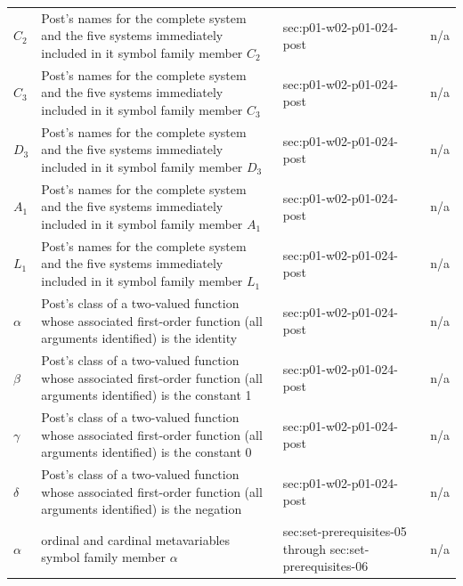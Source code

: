 \begin{longtable}{@{}p{}p{}p{}p{}@{}}
\(C_2\) & Post's names for the complete system and the five systems immediately included in it symbol family member \(C_2\) & sec:\allowbreak{}p01-\allowbreak{}w02-\allowbreak{}p01-\allowbreak{}024-\allowbreak{}post & n/a \\
\(C_3\) & Post's names for the complete system and the five systems immediately included in it symbol family member \(C_3\) & sec:\allowbreak{}p01-\allowbreak{}w02-\allowbreak{}p01-\allowbreak{}024-\allowbreak{}post & n/a \\
\(D_3\) & Post's names for the complete system and the five systems immediately included in it symbol family member \(D_3\) & sec:\allowbreak{}p01-\allowbreak{}w02-\allowbreak{}p01-\allowbreak{}024-\allowbreak{}post & n/a \\
\(A_1\) & Post's names for the complete system and the five systems immediately included in it symbol family member \(A_1\) & sec:\allowbreak{}p01-\allowbreak{}w02-\allowbreak{}p01-\allowbreak{}024-\allowbreak{}post & n/a \\
\(L_1\) & Post's names for the complete system and the five systems immediately included in it symbol family member \(L_1\) & sec:\allowbreak{}p01-\allowbreak{}w02-\allowbreak{}p01-\allowbreak{}024-\allowbreak{}post & n/a \\
\(\alpha\) & Post's class of a two-valued function whose associated first-order function (all arguments identified) is the identity & sec:\allowbreak{}p01-\allowbreak{}w02-\allowbreak{}p01-\allowbreak{}024-\allowbreak{}post & n/a \\
\(\beta\) & Post's class of a two-valued function whose associated first-order function (all arguments identified) is the constant 1 & sec:\allowbreak{}p01-\allowbreak{}w02-\allowbreak{}p01-\allowbreak{}024-\allowbreak{}post & n/a \\
\(\gamma\) & Post's class of a two-valued function whose associated first-order function (all arguments identified) is the constant 0 & sec:\allowbreak{}p01-\allowbreak{}w02-\allowbreak{}p01-\allowbreak{}024-\allowbreak{}post & n/a \\
\(\delta\) & Post's class of a two-valued function whose associated first-order function (all arguments identified) is the negation & sec:\allowbreak{}p01-\allowbreak{}w02-\allowbreak{}p01-\allowbreak{}024-\allowbreak{}post & n/a \\
\(\alpha\) & ordinal and cardinal metavariables symbol family member \(\alpha\) & sec:\allowbreak{}set-\allowbreak{}prerequisites-\allowbreak{}05 through sec:\allowbreak{}set-\allowbreak{}prerequisites-\allowbreak{}06 & n/a \\

\end{longtable}

